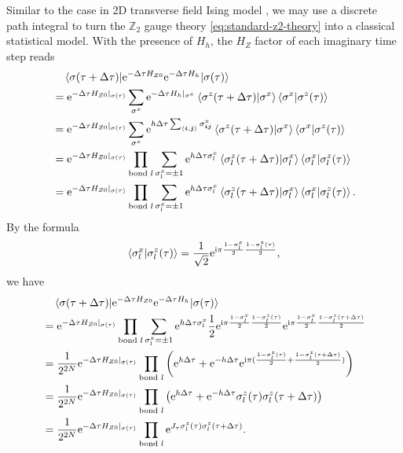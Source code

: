 \documentclass[hyperref, a4paper]{article}
\newcommand*{\ii}{\mathrm{i}}
\newcommand*{\ee}{\mathrm{e}}
\newcommand*{\pair}[1]{\langle #1 \rangle}
\newcommand*{\Ztwo}{$\mathbb{Z}_2$ }
\newcommand*{\tfim}{transverse field Ising model }
\begin{document}
Similar to the case in 2D \tfim, we may use a discrete path integral to turn the \Ztwo gauge theory \eqref{eq:standard-z2-theory} into a classical statistical model.
With the presence of $H_h$, the $H_Z$ factor of each imaginary time step reads
\[
    \begin{aligned}
        &\quad \mel{\sigma(\tau + \Delta \tau)}{\ee^{-\Delta \tau H_{Z0}} \ee^{-\Delta \tau H_h}}{\sigma(\tau)} \\ 
        &= \ee^{-\Delta \tau H_{Z0}|_{\sigma(\tau)}} \sum_{\sigma^x} \ee^{-\Delta \tau H_h|_{\sigma^x}} \braket{\sigma^z(\tau+\Delta \tau)}{\sigma^x} \braket{\sigma^x}{\sigma^z(\tau)} \\
        &= \ee^{-\Delta \tau H_{Z0}|_{\sigma(\tau)}} \sum_{\sigma^x} \ee^{h \Delta \tau \sum_{\pair{\vb*{i}, \vb*{j}}} \sigma^x_{\vb*{i} \vb*{j}}} \braket{\sigma^z(\tau+\Delta \tau)}{\sigma^x} \braket{\sigma^x}{\sigma^z(\tau)} \\
        &= \ee^{-\Delta \tau H_{Z0}|_{\sigma(\tau)}} \prod_{\text{bond } l} \sum_{\sigma^x_l =\pm 1} \ee^{h \Delta \tau \sigma^x_l} \braket{\sigma^z_l(\tau+\Delta \tau)}{\sigma^x_l} \braket{\sigma^x_l}{\sigma^z_l(\tau)} \\
        &= \ee^{-\Delta \tau H_{Z0}|_{\sigma(\tau)}} \prod_{\text{bond } l} \sum_{\sigma^x_l =\pm 1} \ee^{h \Delta \tau \sigma^x_l} \braket{\sigma^z_l(\tau+\Delta \tau)}{\sigma^x_l} \braket{\sigma^x_l}{\sigma^z_l(\tau)}.
    \end{aligned}
\]
By the formula
\[
    \braket{\sigma^x_l}{\sigma^z_l(\tau)} = \frac{1}{\sqrt{2}} \ee^{\ii \pi \frac{1 - \sigma^x_l}{2} \frac{1 - \sigma^z_l(\tau)}{2}} ,
\]
we have
\[
    \begin{aligned}
        &\quad \mel{\sigma(\tau + \Delta \tau)}{\ee^{-\Delta \tau H_{Z0}} \ee^{-\Delta \tau H_h}}{\sigma(\tau)} \\
        &= \ee^{-\Delta \tau H_{Z0}|_{\sigma(\tau)}} \prod_{\text{bond } l} \sum_{\sigma^x_l =\pm 1} \ee^{h \Delta \tau \sigma^x_l} \frac{1}{2} \ee^{\ii \pi \frac{1 - \sigma^x_l}{2} \frac{1 - \sigma^z_l(\tau)}{2}} \ee^{\ii \pi  \frac{1 - \sigma^x_l}{2} \frac{1 - \sigma^z_l(\tau + \Delta \tau)}{2}} \\
        &= \frac{1}{2^{2N}} \ee^{-\Delta \tau H_{Z0}|_{\sigma(\tau)}} \prod_{\text{bond } l} \left( \ee^{h \Delta \tau} + \ee^{- h \Delta \tau} \ee^{\ii \pi (\frac{1 - \sigma^z_l(\tau)}{2} + \frac{1 - \sigma^z_l(\tau + \Delta \tau)}{2})} \right) \\
        &= \frac{1}{2^{2N}} \ee^{-\Delta \tau H_{Z0}|_{\sigma(\tau)}} \prod_{\text{bond } l} \left( \ee^{h \Delta \tau} + \ee^{- h \Delta \tau} \sigma_l^z(\tau) \sigma_l^z(\tau + \Delta \tau) \right) \\
        &= \frac{1}{2^{2N}} \ee^{-\Delta \tau H_{Z0}|_{\sigma(\tau)}} \prod_{\text{bond } l} \ee^{J_\tau \sigma_l^z(\tau) \sigma_l^z(\tau + \Delta \tau)}.
    \end{aligned}
\]
\end{document}
